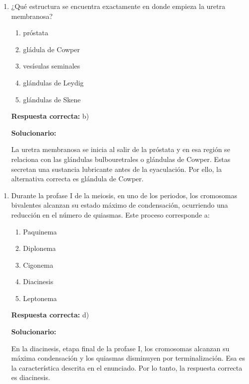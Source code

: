 \begin{enumerate}[resume]
	
	\item ¿Qué estructura se encuentra exactamente en donde empieza la uretra membranosa?
	
	\begin{enumerate}[label=\alph*)]
		\item próstata
		\item gládula de Cowper
		\item vesísulas seminales 
		\item glándulas de Leydig
		\item glándulas de Skene
	\end{enumerate}
	
	\textbf{Respuesta correcta:} b)
	
	\vspace{2mm}
	\textbf{Solucionario:}
	
	La uretra membranosa se inicia al salir de la próstata y en esa región se relaciona con las glándulas bulbouretrales o glándulas de Cowper. Estas secretan una sustancia lubricante antes de la eyaculación. Por ello, la alternativa correcta es glándula de Cowper.
	
\end{enumerate}


\begin{enumerate}[resume]
	
	\item Durante la profase I de la meiosis, en uno de los periodos, los cromosomas bivalentes alcanzan su estado máximo de condensación, ocurriendo una reducción en el número de quiasmas. Este proceso corresponde a:
	
	\begin{enumerate}[label=\alph*)]
		\item Paquinema 
		\item Diplonema
		\item Cigonema
		\item Diacinesis
		\item Leptonema
	\end{enumerate}
	
	\textbf{Respuesta correcta:} d)
	
	\vspace{2mm}
	\textbf{Solucionario:}
	
	En la diacinesis, etapa final de la profase I, los cromosomas alcanzan su máxima condensación y los quiasmas disminuyen por terminalización. Esa es la característica descrita en el enunciado. Por lo tanto, la respuesta correcta es diacinesis.
	
\end{enumerate}

